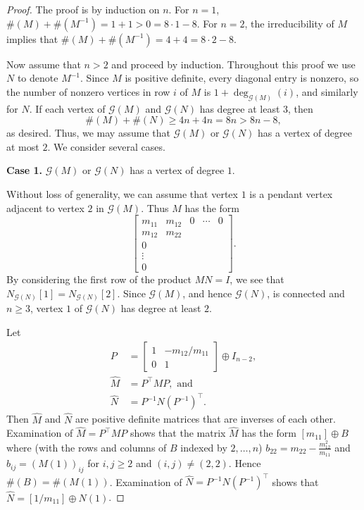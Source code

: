 \documentclass[12pt]{article}
\theoremstyle{definition}
\theoremstyle{definition}
\theoremstyle{definition}
\numberwithin{figure}{section}
\numberwithin{equation}{section}
\newcommand{\G}{\mathcal{G}}
\newcommand{\trans}{^{\top}}
\begin{document}
\begin{proof}
The proof is by induction on $n$.
{For $n=1$, $\#(M)+ \#(M^{-1})= 1+1 > 0=8\cdot 1 -8$.} 
For $n=2$, the irreducibility of $M$ implies 
that $\#(M) + \#(M^{-1})=4 +4 =8\cdot 2 -8$.

Now assume that $n>2$ and proceed by induction.
Throughout {this proof} we use $N$ to denote $M^{-1}$.  Since $M$ is positive definite, every diagonal entry is nonzero, so the number of nonzero vertices in row $i$ of $M$ is $1+\deg_{\G(M)}(i)$, and similarly for $N$.
If each vertex of $\G(M)$ and $\G(N)$ has degree at least 3, then 
\[ 
\#(M)+ \#(N) \geq 4n+4n=8n> 8n-8,
\]
as desired. Thus, we may assume that $\G(M)$ or $\G(N)$ 
has a vertex of degree at most $2$. We consider several cases. 

\bigskip\noindent
{\bf Case 1.} $\G(M)$ or $\G(N)$
has a vertex of degree $1$.

Without loss of generality, we can assume that  vertex
$1$ is a pendant vertex adjacent to  vertex $2$ in $\G(M)$.
Thus $M$ has the form 
\[
\begin{bmatrix}
m_{11} & m_{12} & 0 &\cdots & 0\\
m_{12} & m_{22} \\
0\\
\vdots\\
0 
\end{bmatrix}.
\]
 By considering the first row of the product  $MN=I$, we see that {$N_{\G(N)}[1]=N_{\G(N)}[2]$}. Since $\G(M)$, and hence $\G(N)$,
is connected and $n\geq 3$, vertex $1$ of $\G(N)$ has degree at least $2$. 

Let 
\begin{align*}
P&= \begin{bmatrix}
    1 & -m_{12}/m_{11}\\
    0 & 1
\end{bmatrix} \oplus I_{n-2},\\
\widehat{M}&= P\trans MP, \mbox{ and }\\
\widehat{N}&= P^{-1} N (P^{-1})\trans .
\end{align*}
Then 
$\widehat{M}$ and $\widehat{N}$ are
 positive definite matrices that are inverses of each other.  Examination of $\widehat{M}=P\trans MP$ shows that the  matrix $\widehat{M}$ has the form 
$[m_{11}] \oplus B$  where {(with the rows and columns of $B$ indexed by $2,\dots,n$)  $b_{22}=m_{22}-\frac{m_{12}^2}{m_{11}}$} and $b_{ij}=(M(1))_{ij}$ for $i,j\ge 2$ and $(i,j)\ne (2,2)$. Hence $\#(B)= \#(M(1))$.  Examination of $\widehat{N}=P^{-1} N (P^{-1})\trans$ shows that $\widehat{N}=
[1/m_{11}] \oplus N(1)$. 


\end{proof}
\end{document}
